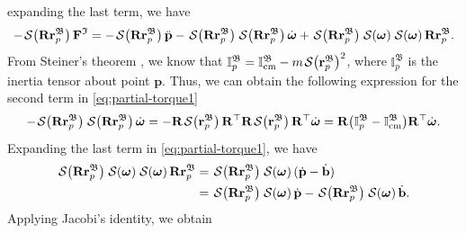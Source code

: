 expanding the last term, we have
\begin{align}
    - \SL[\mathbf{R}\mathbf{r}^\mathfrak{B}_p]\mathbf{F}^\mathfrak{I} = 
    - \SL[\mathbf{R}\mathbf{r}^\mathfrak{B}_p]\ddot{\mathbf{p}} - \SL[\mathbf{R}\mathbf{r}^\mathfrak{B}_p]\SL[\mathbf{R}\mathbf{r}_p^\mathfrak{B}]\dot{\boldsymbol{\omega}} + \SL[\mathbf{R}\mathbf{r}^\mathfrak{B}_p]\SL[\boldsymbol{\omega}]\SL[\boldsymbol{\omega}]\mathbf{R}\mathbf{r}_p^\mathfrak{B}. \label{eq:partial-torque1}
\end{align}
From Steiner's theorem \citep{lemos2018analytical}, we know that $\mathbb{I}^\mathfrak{B}_p = \mathbb{I}^\mathfrak{B}_\text{cm} - m\SL[\mathbf{r}_p^\mathfrak{B}]^2$, where $\mathbb{I}^\mathfrak{B}_p$ is the inertia tensor about point $\mathbf{p}$. Thus, we can obtain the following expression for the second term in \eqref{eq:partial-torque1}
\begin{align}
    - \SL[\mathbf{R}\mathbf{r}^\mathfrak{B}_p]\SL[\mathbf{R}\mathbf{r}_p^\mathfrak{B}]\dot{\boldsymbol{\omega}} = - \mathbf{R}\SL[\mathbf{r}^\mathfrak{B}_p]\mathbf{R}^\top\mathbf{R}\SL[\mathbf{r}_p^\mathfrak{B}]\mathbf{R}^\top\dot{\boldsymbol{\omega}} = \mathbf{R}\bigl(\mathbb{I}^\mathfrak{B}_p - \mathbb{I}^\mathfrak{B}_\text{cm}\bigr)\mathbf{R}^\top\dot{\boldsymbol{\omega}}.
    \label{eq:partial-torque2}
\end{align}
Expanding the last term in \eqref{eq:partial-torque1}, we have
\begin{align}
    \begin{split}
        \SL[\mathbf{R}\mathbf{r}^\mathfrak{B}_p]\SL[\boldsymbol{\omega}]\SL[\boldsymbol{\omega}]\mathbf{R}\mathbf{r}_p^\mathfrak{B} &= \SL[\mathbf{R}\mathbf{r}^\mathfrak{B}_p]\SL[\boldsymbol{\omega}](\dot{\mathbf{p}} - \dot{\mathbf{b}})\\
        &= \SL[\mathbf{R}\mathbf{r}^\mathfrak{B}_p]\SL[\boldsymbol{\omega}]\dot{\mathbf{p}} - \SL[\mathbf{R}\mathbf{r}^\mathfrak{B}_p]\SL[\boldsymbol{\omega}]\dot{\mathbf{b}}.
    \end{split}
\end{align}
Applying Jacobi's identity, we obtain
